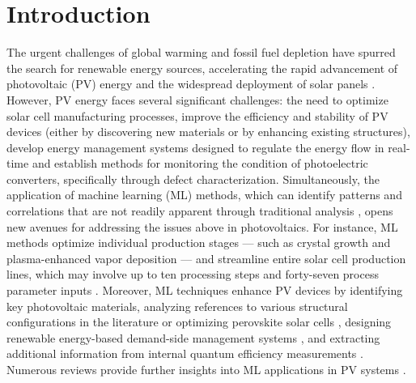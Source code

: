 \documentclass[a4paper,fleqn]{cas-sc}
\begin{document}
\maketitle

\section{Introduction}%
\par
The urgent challenges of global warming and fossil fuel depletion have spurred the search
for renewable energy sources, accelerating the rapid advancement of photovoltaic (PV) energy and the widespread deployment of solar panels \cite{Pata2024, Holechek2022}.
However, PV energy faces several significant challenges:
the need to optimize solar cell manufacturing processes,
improve the efficiency and stability of PV devices
(either by discovering new materials or by enhancing existing structures),
develop energy management systems designed to regulate the energy flow in real-time and
establish methods for monitoring the condition of photoelectric converters, specifically through defect characterization.
Simultaneously, the application of machine learning (ML) methods,
which can identify patterns and correlations that are not readily apparent through traditional analysis \cite{Park2022},
opens new avenues for addressing the issues above in photovoltaics.
For instance, ML methods optimize individual production stages ---
such as crystal growth \cite{Qi2020} and plasma-enhanced vapor deposition \cite{Rachdi2021} ---
and streamline entire solar cell production lines, which may involve up to ten processing steps and forty-seven process parameter inputs \cite{Buratti2020}.
Moreover, ML techniques enhance PV devices by identifying key photovoltaic materials,
analyzing references to various structural configurations in the literature \cite{Zhang2022} or
optimizing perovskite solar cells \cite{Liu2023},
designing renewable energy-based demand-side management systems \cite{Asghar2023},
and extracting additional information from internal quantum efficiency measurements \cite{AbdullahVetter2025}.
Numerous reviews provide further insights into ML applications in PV systems \cite{DiSabatino2024, Datta2023, Jaiswal2023, Buratti2024, Bhatti2023}.
\end{document}
